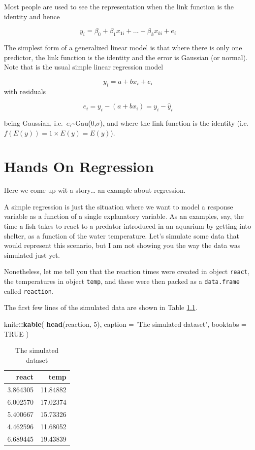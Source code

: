 \documentclass[
]{book}
\newenvironment{Shaded}{\begin{snugshade}}{\end{snugshade}}
\newcommand{\DataTypeTok}[1]{\textcolor[rgb]{0.13,0.29,0.53}{#1}}
\newcommand{\DecValTok}[1]{\textcolor[rgb]{0.00,0.00,0.81}{#1}}
\newcommand{\KeywordTok}[1]{\textcolor[rgb]{0.13,0.29,0.53}{\textbf{#1}}}
\newcommand{\NormalTok}[1]{#1}
\newcommand{\OperatorTok}[1]{\textcolor[rgb]{0.81,0.36,0.00}{\textbf{#1}}}
\newcommand{\OtherTok}[1]{\textcolor[rgb]{0.56,0.35,0.01}{#1}}
\newcommand{\StringTok}[1]{\textcolor[rgb]{0.31,0.60,0.02}{#1}}
\begin{document}
Most people are used to see the representation when the link function is the identity and hence

\[ y_i =  \beta_0+\beta_1 x_{1i} + ... + \beta_k x_{ki} + e_i \]

The simplest form of a generalized linear model is that where there is only one predictor, the link function is the identity and the error is Gaussian (or normal). Note that is the usual simple linear regression model

\[y_i=a+bx_i+e_i\]
with residuals

\[e_i=y_i - (a+bx_i)= y_i-\hat y_i\]

being Gaussian, i.e.~\(e_i\)\textasciitilde Gau(0,\(\sigma\)), and where the link function is the identity (i.e.~\(f(E(y))=1 \times E(y)=E(y)\)).

\hypertarget{handson}{%
\chapter{Hands On Regression}\label{handson}}

Here we come up wit a story\ldots{} an example about regression.

A simple regression is just the situation where we want to model a response variable as a function of a single explanatory variable. As an examples, say, the time a fish takes to react to a predator introduced in an aquarium by getting into shelter, as a function of the water temperature. Let's simulate some data that would represent this scenario, but I am not showing you the way the data was simulated just yet.

Nonetheless, let me tell you that the reaction times were created in object \texttt{react}, the temperatures in object \texttt{temp}, and these were then packed as a \texttt{data.frame} called \texttt{reaction}.

The first few lines of the simulated data are shown in Table \ref{tab:Ttab1}.

\begin{Shaded}
\begin{Highlighting}[]
\NormalTok{knitr}\OperatorTok{::}\KeywordTok{kable}\NormalTok{(}
  \KeywordTok{head}\NormalTok{(reaction, }\DecValTok{5}\NormalTok{), }\DataTypeTok{caption =} \StringTok{'The simulated dataset'}\NormalTok{,}
  \DataTypeTok{booktabs =} \OtherTok{TRUE}
\NormalTok{)}
\end{Highlighting}
\end{Shaded}

\begin{table}

\caption{\label{tab:Ttab1}The simulated dataset}
\centering
\begin{tabular}[t]{rr}
\toprule
react & temp\\
\midrule
3.864305 & 11.84882\\
6.002570 & 17.02374\\
5.400667 & 15.73326\\
4.462596 & 11.68052\\
6.689445 & 19.43839\\
\bottomrule
\end{tabular}
\end{table}
\end{document}
